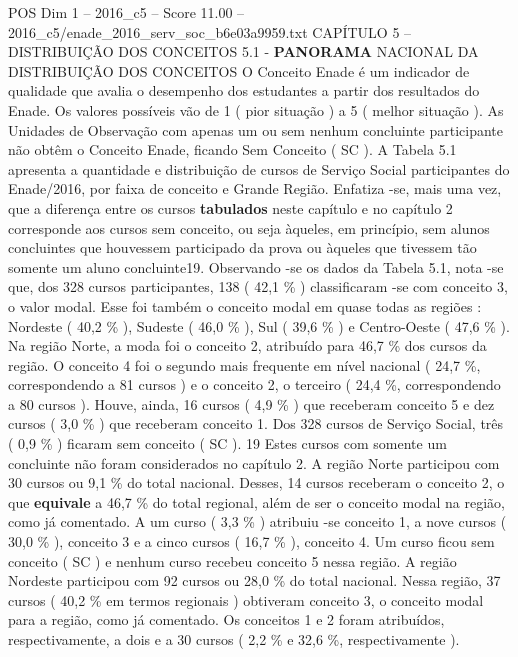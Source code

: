 \begin{textsample}{POS Dim 1 – 2016\_c5 – Score 11.00 – 2016\_c5/enade\_2016\_serv\_soc\_b6e03a9959.txt}  \label{ex:f1_pos_071}
CAPÍTULO 5 – DISTRIBUIÇÃO DOS CONCEITOS 5.1 - \textbf{PANORAMA} NACIONAL DA DISTRIBUIÇÃO DOS CONCEITOS O Conceito Enade é um indicador de qualidade que avalia o desempenho dos estudantes a partir dos resultados do Enade.
Os valores possíveis vão de 1 ( pior situação ) a 5 ( melhor situação ).
As Unidades de Observação com apenas um ou sem nenhum concluinte participante não obtêm o Conceito Enade, ficando Sem Conceito ( SC ).
A Tabela 5.1 apresenta a quantidade e distribuição de cursos de Serviço Social participantes do Enade/2016, por faixa de conceito e Grande Região.
Enfatiza -se, mais uma vez, que a diferença entre os cursos \textbf{tabulados} neste capítulo e no capítulo 2 corresponde aos cursos sem conceito, ou seja àqueles, em princípio, sem alunos concluintes que houvessem participado da prova ou àqueles que tivessem tão somente um aluno concluinte19.
Observando -se os dados da Tabela 5.1, nota -se que, dos 328 cursos participantes, 138 ( 42,1 \% ) classificaram -se com conceito 3, o valor modal.
Esse foi também o conceito modal em quase todas as regiões : Nordeste ( 40,2 \% ), Sudeste ( 46,0 \% ), Sul ( 39,6 \% ) e Centro-Oeste ( 47,6 \% ).
Na região Norte, a moda foi o conceito 2, atribuído para 46,7 \% dos cursos da região.
O conceito 4 foi o segundo mais frequente em nível nacional ( 24,7 \%, correspondendo a 81 cursos ) e o conceito 2, o terceiro ( 24,4 \%, correspondendo a 80 cursos ).
Houve, ainda, 16 cursos ( 4,9 \% ) que receberam conceito 5 e dez cursos ( 3,0 \% ) que receberam conceito 1.
Dos 328 cursos de Serviço Social, três ( 0,9 \% ) ficaram sem conceito ( SC ). 19 Estes cursos com somente um concluinte não foram considerados no capítulo 2.
A região Norte participou com 30 cursos ou 9,1 \% do total nacional.
Desses, 14 cursos receberam o conceito 2, o que \textbf{equivale} a 46,7 \% do total regional, além de ser o conceito modal na região, como já comentado.
A um curso ( 3,3 \% ) atribuiu -se conceito 1, a nove cursos ( 30,0 \% ), conceito 3 e a cinco cursos ( 16,7 \% ), conceito 4.
Um curso ficou sem conceito ( SC ) e nenhum curso recebeu conceito 5 nessa região.
A região Nordeste participou com 92 cursos ou 28,0 \% do total nacional.
Nessa região, 37 cursos ( 40,2 \% em termos regionais ) obtiveram conceito 3, o conceito modal para a região, como já comentado.
Os conceitos 1 e 2 foram atribuídos, respectivamente, a dois e a 30 cursos ( 2,2 \% e 32,6 \%, respectivamente ).

\end{textsample}
